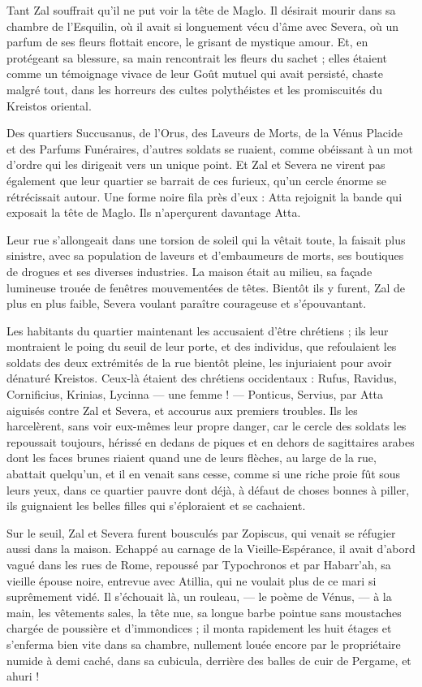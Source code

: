\documentclass[a4paper, 11pt, oneside, polutonikogreek, french]{article}
\begin{document}
Tant Zal souffrait qu'il ne put voir la tête de Maglo. Il désirait mourir dans sa chambre de l'Esquilin, où il avait si longuement vécu d'âme avec Severa, où un parfum de ses fleurs flottait encore, le grisant de mystique amour. Et, en protégeant sa blessure, sa main rencontrait les fleurs du sachet ; elles étaient comme un témoignage vivace de leur Goût mutuel qui avait persisté, chaste malgré tout, dans les horreurs des cultes polythéistes et les promiscuités du Kreistos oriental.

Des quartiers Succusanus, de l'Orus, des Laveurs de Morts, de la Vénus Placide et des Parfums Funéraires, d'autres soldats se ruaient, comme obéissant à un mot d'ordre qui les dirigeait vers un unique point. Et Zal et Severa ne virent pas également que leur quartier se barrait de ces furieux, qu'un cercle énorme se rétrécissait autour. Une forme noire fila près d'eux : Atta rejoignit la bande qui exposait la tête de Maglo. Ils n'aperçurent davantage Atta.

Leur rue s'allongeait dans une torsion de soleil qui la vêtait toute, la faisait plus sinistre, avec sa population de laveurs et d'embaumeurs de morts, ses boutiques de drogues et ses diverses industries. La maison était au milieu, sa façade lumineuse trouée de fenêtres mouvementées de têtes. Bientôt ils y furent, Zal de plus en plus faible, Severa voulant paraître courageuse et s'épouvantant.

Les habitants du quartier maintenant les accusaient d'être chrétiens ; ils leur montraient le poing du seuil de leur porte, et des individus, que refoulaient les soldats des deux extrémités de la rue bientôt pleine, les injuriaient pour avoir dénaturé Kreistos. Ceux-là étaient des chrétiens occidentaux : Rufus, Ravidus, Cornificius, Krinias, Lycinna --- une femme ! --- Ponticus, Servius, par Atta aiguisés contre Zal et Severa, et accourus aux premiers troubles. Ils les harcelèrent, sans voir eux-mêmes leur propre danger, car le cercle des soldats les repoussait toujours, hérissé en dedans de piques et en dehors de sagittaires arabes dont les faces brunes riaient quand une de leurs flèches, au large de la rue, abattait quelqu'un, et il en venait sans cesse, comme si une riche proie fût sous leurs yeux, dans ce quartier pauvre dont déjà, à défaut de choses bonnes à piller, ils guignaient les belles filles qui s'éploraient et se cachaient.

Sur le seuil, Zal et Severa furent bousculés par Zopiscus, qui venait se réfugier aussi dans la maison. Echappé au carnage de la Vieille-Espérance, il avait d'abord vagué dans les rues de Rome, repoussé par Typochronos et par Habarr'ah, sa vieille épouse noire, entrevue avec Atillia, qui ne voulait plus de ce mari si suprêmement vidé. Il s'échouait là, un rouleau, --- le poème de Vénus, --- à la main, les vêtements sales, la tête nue, sa longue barbe pointue sans moustaches chargée de poussière et d'immondices ; il monta rapidement les huit étages et s'enferma bien vite dans sa chambre, nullement louée encore par le propriétaire numide à demi caché, dans sa cubicula, derrière des balles de cuir de Pergame, et ahuri !
\end{document}
